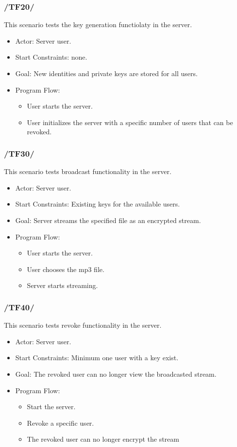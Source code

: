 \documentclass[a4paper,10pt]{scrartcl}
\begin{document}
\subsubsection{/TF20/}
This scenario tests the key generation functiolaty in the server.
\begin{itemize}
	\item Actor: Server user.
	\item Start Constraints: none.
	\item Goal: New identities and private keys are stored for all users.
	\item Program Flow:
	\begin{itemize}
   \item User starts the server.
   \item User initializes the server with a specific number of users that can be revoked.
\end{itemize}
\end{itemize}

\subsubsection{/TF30/}
This scenario tests broadcast functionality in the server.

\begin{itemize}
	\item Actor: Server user.
	\item Start Constraints: Existing keys for the available users.
	\item Goal: Server streams the specified file as an encrypted stream.
	\item Program Flow:
	\begin{itemize}
   \item User starts the server.
   \item User chooses the mp3 file.
   \item Server starts streaming.
\end{itemize}
\end{itemize}

\subsubsection{/TF40/}
This scenario tests revoke functionality in the server.

\begin{itemize}
	\item Actor: Server user.
	\item Start Constraints: Minimum one user with a key exist.
	\item Goal: The revoked user can no longer view the broadcasted stream.
	\item Program Flow:
	\begin{itemize}
   \item Start the server.
   \item Revoke a specific user.
   \item The revoked user can no longer encrypt the stream
\end{itemize}
\end{itemize}
\end{document}
